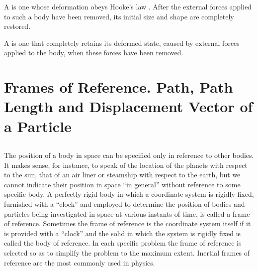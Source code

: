 A  is one whose deformation obeys Hooke's law . After the external forces applied to such a body have been removed, its initial size and shape are completely restored.

A  is one that completely retains its deformed state, caused by external forces applied to the body, when these forces have been removed.

\section[Frames of Reference. Path, Path Length]{Frames of Reference. Path, Path Length and Displacement Vector of a Particle}
\label{sec-1.2}

\subsection{}\label{1.2.1} The position of a body in space can be specified only in reference to other bodies. It makes sense, for instance, to speak of the location of the planets with respect to the sun, that of an air liner or steamship with respect to the earth, but we cannot indicate their position in space ``in general'' without ref­erence to some specific body. A perfectly rigid body in which a coordinate system is rigidly fixed, furnished with a ``clock'' and employed to determine the position of bodies and particles being investigated in space at various instants of time, is called a frame of reference. Sometimes the frame of reference is the coordinate system itself if it is provided with a ``clock'' and the solid in which the system is rigidly fixed is called the body of reference. In each specific problem the frame of refer­ence is selected so as to simplify the problem to the maximum extent. Inertial frames of reference  are the most com­monly used in physics.

